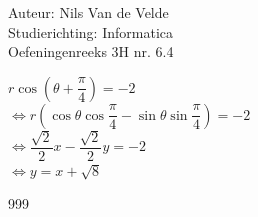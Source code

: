 \documentclass[a4paper]{article}
\begin{document}
  
\noindent \large Auteur: Nils Van de Velde \\
\noindent \large Studierichting: Informatica\\
\noindent \large Oefeningenreeks 3H nr. 6.4\\

\medskip

\normalsize

$r\cos\left(\theta+\dfrac{\pi}{4}\right) = -2$\\

$\Leftrightarrow r\left(\cos\theta\cos\dfrac{\pi}{4}-\sin\theta\sin\dfrac{\pi}{4}\right) = -2$\\

$\Leftrightarrow \dfrac{\sqrt{2}}{2}x-\dfrac{\sqrt{2}}{2}y = -2$\\

$\Leftrightarrow y = x + \sqrt{8}$\\

\begin{thebibliography}{999}
\end{thebibliography}
\end{document}
